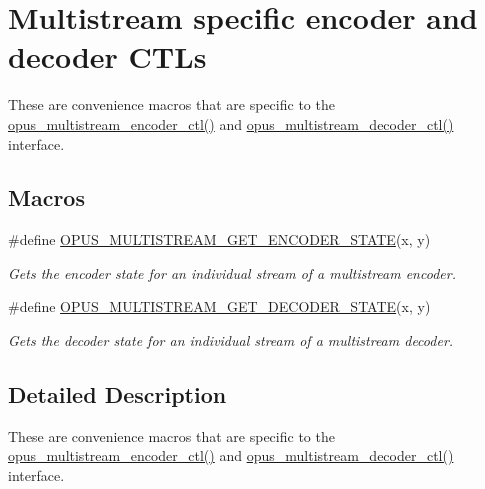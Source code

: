 \hypertarget{group__opus__multistream__ctls}{}\section{Multistream specific encoder and decoder C\+T\+Ls}
\label{group__opus__multistream__ctls}


These are convenience macros that are specific to the \hyperlink{group__opus__multistream_gae14328330c548dede66c494f51e33707}{opus\+\_\+multistream\+\_\+encoder\+\_\+ctl()} and \hyperlink{group__opus__multistream_ga4b3dca8d46e5868cc133f3f6d2b57688}{opus\+\_\+multistream\+\_\+decoder\+\_\+ctl()} interface.  


\subsection*{Macros}
\begin{DoxyCompactItemize}
\item 
\#define \hyperlink{group__opus__multistream__ctls_ga4e67607eb691c4314a5de90d8c58aff0}{O\+P\+U\+S\+\_\+\+M\+U\+L\+T\+I\+S\+T\+R\+E\+A\+M\+\_\+\+G\+E\+T\+\_\+\+E\+N\+C\+O\+D\+E\+R\+\_\+\+S\+T\+A\+TE}(x,  y)
\begin{DoxyCompactList}\small\item\em Gets the encoder state for an individual stream of a multistream encoder. \end{DoxyCompactList}\item 
\#define \hyperlink{group__opus__multistream__ctls_gaf0843831519b4d9b9d73391afef04a53}{O\+P\+U\+S\+\_\+\+M\+U\+L\+T\+I\+S\+T\+R\+E\+A\+M\+\_\+\+G\+E\+T\+\_\+\+D\+E\+C\+O\+D\+E\+R\+\_\+\+S\+T\+A\+TE}(x,  y)
\begin{DoxyCompactList}\small\item\em Gets the decoder state for an individual stream of a multistream decoder. \end{DoxyCompactList}\end{DoxyCompactItemize}


\subsection{Detailed Description}
These are convenience macros that are specific to the \hyperlink{group__opus__multistream_gae14328330c548dede66c494f51e33707}{opus\+\_\+multistream\+\_\+encoder\+\_\+ctl()} and \hyperlink{group__opus__multistream_ga4b3dca8d46e5868cc133f3f6d2b57688}{opus\+\_\+multistream\+\_\+decoder\+\_\+ctl()} interface. 

